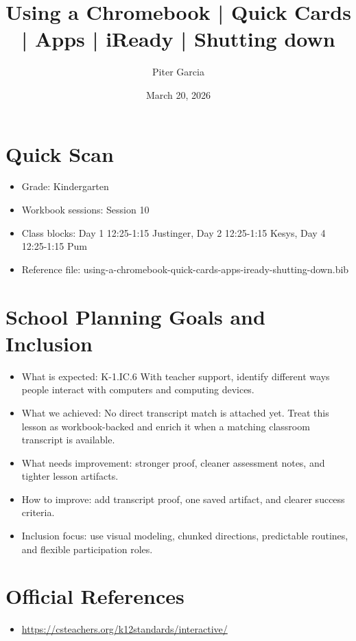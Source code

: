 \documentclass[11pt]{article}
\title{Using a Chromebook | Quick Cards | Apps | iReady | Shutting down}
\author{Piter Garcia}
\date{March 20, 2026}
\begin{document}
\maketitle
\section*{Quick Scan}
\begin{itemize}[leftmargin=*]
\item Grade: Kindergarten
\item Workbook sessions: Session 10
\item Class blocks: Day 1 12:25-1:15 Justinger, Day 2 12:25-1:15 Kesys, Day 4 12:25-1:15 Pum
\item Reference file: using-a-chromebook-quick-cards-apps-iready-shutting-down.bib
\end{itemize}
\section*{School Planning Goals and Inclusion}
\begin{itemize}[leftmargin=*]
\item What is expected: K-1.IC.6 With teacher support, identify different ways people interact with computers and computing devices.
\item What we achieved: No direct transcript match is attached yet. Treat this lesson as workbook-backed and enrich it when a matching classroom transcript is available.
\item What needs improvement: stronger proof, cleaner assessment notes, and tighter lesson artifacts.
\item How to improve: add transcript proof, one saved artifact, and clearer success criteria.
\item Inclusion focus: use visual modeling, chunked directions, predictable routines, and flexible participation roles.
\end{itemize}
\section*{Official References}
\begin{itemize}[leftmargin=*]
\item \url{https://csteachers.org/k12standards/interactive/}

\end{itemize}
\end{document}
